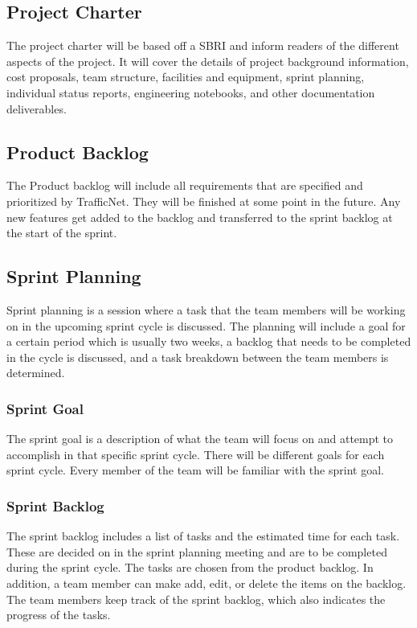 \subsection{Project Charter}
The project charter will be based off a SBRI and inform readers of the different aspects of the project. It will cover the details of project background information, cost proposals, team structure, facilities and equipment, sprint planning, individual status reports, engineering notebooks, and other documentation deliverables.

\subsection{Product Backlog}
The Product backlog will include all requirements that are specified and prioritized by TrafficNet. They will be finished at some point in the future. Any new features get added to the backlog and transferred to the sprint backlog at the start of the sprint.

\subsection{Sprint Planning}
Sprint planning is a session where a task that the team members will be working on in the upcoming sprint cycle is discussed. The planning will include a goal for a certain period which is usually two weeks, a backlog that needs to be completed in the cycle is discussed, and a task breakdown between the team members is determined. 

\subsubsection{Sprint Goal}
The sprint goal is a description of what the team will focus on and attempt to accomplish in that specific sprint cycle. There will be different goals for each sprint cycle. Every member of the team will be familiar with the sprint goal.

\subsubsection{Sprint Backlog}
The sprint backlog includes a list of tasks and the estimated time for each task. These are decided on in the sprint planning meeting and are to be completed during the sprint cycle. The tasks are chosen from the product backlog. In addition, a team member can make add, edit, or delete the items on the backlog. The team members keep track of the sprint backlog, which also indicates the progress of the tasks.


